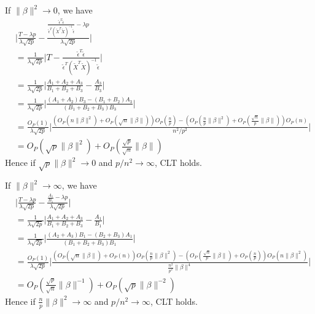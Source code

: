 \documentclass[review]{elsarticle}
\theoremstyle{plain}
\theoremstyle{definition}
\theoremstyle{remark}
\begin{document}
If $\|\beta\|^2\to 0$, we have
\begin{equation}
    \begin{aligned}
        &\Big|\frac{T-{\lambda p}}{\lambda\sqrt{2p}
        }-
    \frac{\frac{\tilde{\epsilon}^T\tilde{\epsilon}
    }{\tilde{\epsilon}^T{(\tilde{X}^T\tilde{X})}^{-1}\tilde{\epsilon}
        }-{\lambda p}}{\lambda\sqrt{2p}
        }\Big|\\
        &=
        \frac{1}{\lambda\sqrt{2p}}
    \Big|T-\frac{\tilde{\epsilon}^T\tilde{\epsilon}
    }{\tilde{\epsilon}^T{(\tilde{X}^T\tilde{X})}^{-1}\tilde{\epsilon}
        }\Big|\\
        &=
        \frac{1}{\lambda\sqrt{2p}}
        \Big|
        \frac{A_1+A_2+A_3}{B_1+B_2+B_3}-\frac{A_3}{B_3}
        \Big|\\
        &=
        \frac{1}{\lambda\sqrt{2p}}
        \Big|
        \frac{(A_1+A_2)B_3-(B_1+B_2)A_3}{(B_1+B_2+B_3)B_3}
        \Big|\\
        &=
        \frac{O_{P}(1)}{\lambda\sqrt{2p}}
        \Big|
        \frac{(O_P(n\|\beta\|^2)+O_P(\sqrt{n}\|\beta\|))O_P(\frac{n}{p})-(O_P(\frac{n}{p}\|\beta\|^2)+O_P(\frac{\sqrt{n}}{p}\|\beta\|))O_P(n)}{n^2/p^2}
        \Big|\\
        &=O_P(\sqrt{p}\|\beta\|^2)+O_P(\frac{\sqrt{p}}{\sqrt{n}}\|\beta\|)
    \end{aligned}
\end{equation}
Hence if $\sqrt{p}\|\beta\|^2\to 0$ and $p/n^2\to \infty$, CLT holds.

If $\|\beta\|^2\to \infty$, we have
\begin{equation}
    \begin{aligned}
        &\Big|\frac{T-{\lambda p}}{\lambda\sqrt{2p}
        }-
    \frac{\frac{A_1}{B_1}-{\lambda p}}{\lambda\sqrt{2p}
        }\Big|\\
        &=
        \frac{1}{\lambda\sqrt{2p}}
        \Big|
        \frac{A_1+A_2+A_3}{B_1+B_2+B_3}-\frac{A_1}{B_1}
        \Big|\\
        &=
        \frac{1}{\lambda\sqrt{2p}}
        \Big|
        \frac{(A_2+A_3)B_1-(B_2+B_3)A_1}{(B_1+B_2+B_3)B_1}
        \Big|\\
        &=
        \frac{O_{P}(1)}{\lambda\sqrt{2p}}
        \Big|
        \frac{(O_P(\sqrt{n}\|\beta\|)+O_P(n))O_P(\frac{n}{p}\|\beta\|^2)-(O_P(\frac{\sqrt{n}}{p}\|\beta\|)+O_P(\frac{n}{p}))O_P(n\|\beta\|^2)}{\frac{n^2}{p^2}\|\beta\|^4}
        \Big|\\
        &=O_P(\frac{\sqrt{p}}{\sqrt{n}}\|\beta\|^{-1})+O_P(\sqrt{p}\|\beta\|^{-2})
    \end{aligned}
\end{equation}
Hence if $\frac{n}{p}\|\beta\|^2\to \infty$ and $p/n^2\to \infty$, CLT holds.
\end{document}
